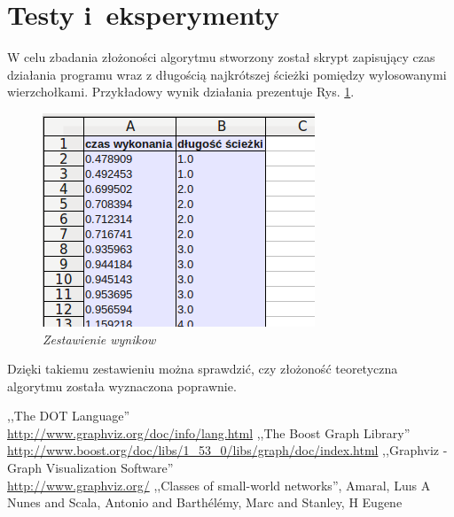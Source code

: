 \documentclass[a4paper, 12pt]{article}
\begin{document}
\section{Testy i~eksperymenty}

W celu zbadania złożoności algorytmu stworzony został skrypt zapisujący czas działania programu wraz z długością najkrótszej ścieżki pomiędzy wylosowanymi wierzchołkami. Przykładowy wynik działania prezentuje Rys. \ref{fig:tabela}.

\begin{figure}[ht]
\centering
\includegraphics[scale=0.7]{tabela.png}
\caption{\em Zestawienie wynikow}
\label{fig:tabela}
\end{figure}

Dzięki takiemu zestawieniu można sprawdzić, czy złożoność teoretyczna algorytmu została wyznaczona poprawnie.

\begin{thebibliography}{}
 ,,The DOT Language'' \\ \url{http://www.graphviz.org/doc/info/lang.html}
 ,,The Boost Graph Library'' \\ \url{http://www.boost.org/doc/libs/1_53_0/libs/graph/doc/index.html}
 ,,Graphviz - Graph Visualization Software'' \\ \url{http://www.graphviz.org/}
 ,,Classes of small-world networks'', Amaral, Lu{\i}s A Nunes and Scala, Antonio and Barth{\'e}l{\'e}my, Marc and Stanley, H Eugene
\end{thebibliography}
\end{document}
